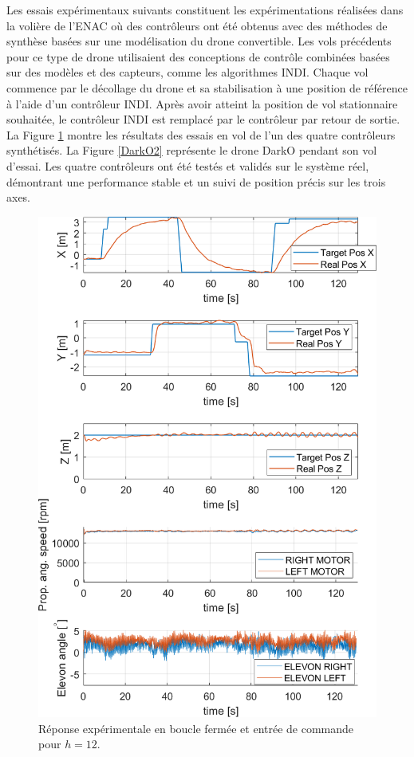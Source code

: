 Les essais expérimentaux suivants constituent les expérimentations réalisées dans la volière de l'ENAC où des contrôleurs ont été obtenus avec des méthodes de synthèse basées sur une modélisation du drone convertible. Les vols précédents pour ce type de drone utilisaient des conceptions de contrôle combinées basées sur des modèles et des capteurs, comme les algorithmes INDI. Chaque vol commence par le décollage du drone et sa stabilisation à une position de référence à l'aide d'un contrôleur INDI. Après avoir atteint la position de vol stationnaire souhaitée, le contrôleur INDI est remplacé par le contrôleur par retour de sortie. La Figure \ref{Dabbene_Flight_Test} montre les résultats des essais en vol de l'un des quatre contrôleurs synthétisés. La Figure \ref{DarkO2} représente le drone DarkO pendant son vol d'essai. Les quatre contrôleurs ont été testés et validés sur le système réel, démontrant une performance stable et un suivi de position précis sur les trois axes.


\begin{figure}[ht!]
    \centering
    \includegraphics[width=0.6\columnwidth]{figures/realflight_z_adjust_x_adjust_final_HopeCrop.png}
   \vspace{-0.5cm}\caption{Réponse expérimentale en boucle fermée et entrée de commande pour $h = 12$.}
    \label{Dabbene_Flight_Test}
\end{figure}


